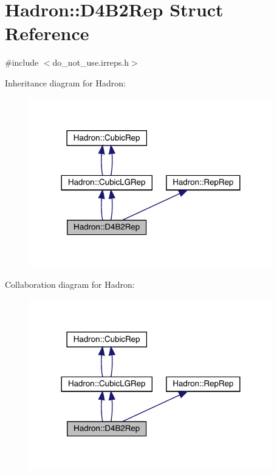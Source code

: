 \hypertarget{structHadron_1_1D4B2Rep}{}\section{Hadron\+:\+:D4\+B2\+Rep Struct Reference}
\label{structHadron_1_1D4B2Rep}


{\ttfamily \#include $<$do\+\_\+not\+\_\+use.\+irreps.\+h$>$}



Inheritance diagram for Hadron\+:\nopagebreak
\begin{figure}[H]
\begin{center}
\leavevmode
\includegraphics[width=300pt]{dd/d69/structHadron_1_1D4B2Rep__inherit__graph}
\end{center}
\end{figure}


Collaboration diagram for Hadron\+:\nopagebreak
\begin{figure}[H]
\begin{center}
\leavevmode
\includegraphics[width=300pt]{d0/d73/structHadron_1_1D4B2Rep__coll__graph}
\end{center}
\end{figure}
